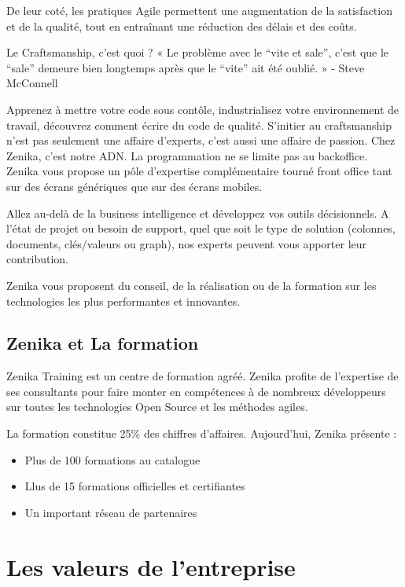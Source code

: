 De leur coté, les pratiques Agile permettent une augmentation de la satisfaction et de la qualité, tout en entraînant une réduction des délais et des coûts. 

 Le Craftsmanship, c’est quoi ?
« Le problème avec le ``vite et sale'', c'est que le ``sale'' demeure bien longtemps après que le ``vite'' ait été oublié. » - Steve McConnell

Apprenez à mettre votre code sous contôle, industrialisez votre environnement de travail, découvrez comment écrire du code de qualité. S’initier au craftsmanship n’est pas seulement une affaire d’experts, c’est aussi une affaire de passion. Chez Zenika, c’est notre ADN.
 La programmation ne se limite pas au backoffice. Zenika vous propose un pôle d’expertise complémentaire tourné front office tant sur des écrans génériques que sur des écrans mobiles.


 Allez au-delà de la business intelligence et développez vos outils décisionnels. A l’état de projet ou besoin de support, quel que soit le type de solution (colonnes, documents, clés\slash valeurs ou graph), nos experts peuvent vous apporter leur contribution. 

Zenika vous proposent du conseil, de la réalisation ou de la formation sur les technologies les plus performantes et innovantes.

\subsection{Zenika et La formation}
\label{zenikaetlaformation}

Zenika Training est un centre de formation agréé. Zenika profite de l'expertise de ses consultants pour faire monter en compétences à de nombreux développeurs sur toutes les technologies Open Source et les méthodes agiles. 

La formation constitue 25\% des chiffres d'affaires. Aujourd'hui, Zenika
 présente :

\begin{itemize}
\item Plus de 100 formations au catalogue

\item Llus de 15 formations officielles et certifiantes

\item Un important réseau de partenaires

\end{itemize}

\section{Les valeurs de l'entreprise}
\label{lesvaleursdelentreprise}

